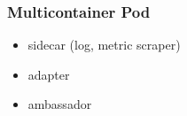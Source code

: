 \subsubsection{Multicontainer Pod}
\begin{frame}[fragile]{\subsubsecname}
  \begin{itemize}
  \item sidecar (log, metric scraper)
  \item adapter
  \item ambassador
  \end{itemize}
\end{frame}
